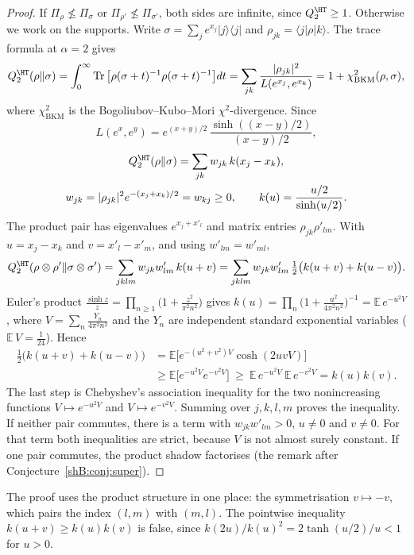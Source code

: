 \begin{proof}
If $\Pi_\rho\not\le\Pi_\sigma$ or $\Pi_{\rho'}\not\le\Pi_{\sigma'}$, both sides are infinite, since $Q^\HT_2\ge1$. Otherwise we work on the supports. Write $\sigma=\sum_je^{x_j}|j\rangle\langle j|$ and $\rho_{jk}=\langle j|\rho|k\rangle$. The trace formula at $\alpha=2$ \cite[(2.11)]{BeigiHircheTomamichel2025} gives
\[
Q^\HT_2(\rho\|\sigma)=\int_0^\infty\Tr\big[\rho(\sigma+t)^{-1}\rho(\sigma+t)^{-1}\big]dt=\sum_{jk}\frac{|\rho_{jk}|^2}{L(e^{x_j},e^{x_k})}=1+\chi^2_{\mathrm{BKM}}(\rho,\sigma),
\]
where $\chi^2_{\mathrm{BKM}}$ is the Bogoliubov--Kubo--Mori $\chi^2$-divergence. Since
\[
L(e^x,e^y)=e^{(x+y)/2}\,\frac{\sinh((x-y)/2)}{(x-y)/2},
\]
\begin{gather*}
Q^\HT_2(\rho\|\sigma)=\sum_{jk}w_{jk}\,k(x_j-x_k),\\
w_{jk}=|\rho_{jk}|^2e^{-(x_j+x_k)/2}=w_{kj}\ge0,\qquad k(u)=\frac{u/2}{\sinh(u/2)} .
\end{gather*}
The product pair has eigenvalues $e^{x_j+x'_l}$ and matrix entries $\rho_{jk}\rho'_{lm}$. With $u=x_j-x_k$ and $v=x'_l-x'_m$, and using $w'_{lm}=w'_{ml}$,
\[
Q^\HT_2(\rho\otimes\rho'\|\sigma\otimes\sigma')=\sum_{jklm}w_{jk}w'_{lm}\,k(u+v)=\sum_{jklm}w_{jk}w'_{lm}\,\tfrac12\big(k(u+v)+k(u-v)\big).
\]
Euler's product $\frac{\sinh z}{z}=\prod_{n\ge1}\big(1+\frac{z^2}{\pi^2n^2}\big)$ gives $k(u)=\prod_n\big(1+\frac{u^2}{4\pi^2n^2}\big)^{-1}=\mathbb E\,e^{-u^2V}$, where $V=\sum_n\frac{Y_n}{4\pi^2n^2}$ and the $Y_n$ are independent standard exponential variables ($\mathbb E\,V=\frac1{24}$). Hence
\[
\begin{aligned}
\tfrac12\big(k(u+v)+k(u-v)\big)&=\mathbb E\big[e^{-(u^2+v^2)V}\cosh(2uvV)\big]\\
&\ge\mathbb E\big[e^{-u^2V}e^{-v^2V}\big]\ \ge\ \mathbb E\,e^{-u^2V}\ \mathbb E\,e^{-v^2V}=k(u)k(v).
\end{aligned}
\]
The last step is Chebyshev's association inequality for the two nonincreasing functions $V\mapsto e^{-u^2V}$ and $V\mapsto e^{-v^2V}$. Summing over $j,k,l,m$ proves the inequality. If neither pair commutes, there is a term with $w_{jk}w'_{lm}>0$, $u\ne0$ and $v\ne0$. For that term both inequalities are strict, because $V$ is not almost surely constant. If one pair commutes, the product shadow factorises (the remark after Conjecture~\ref{shB:conj:super}).
\end{proof}

The proof uses the product structure in one place: the symmetrisation $v\mapsto-v$, which pairs the index $(l,m)$ with $(m,l)$. The pointwise inequality $k(u+v)\ge k(u)k(v)$ is false, since $k(2u)/k(u)^2=2\tanh(u/2)/u<1$ for $u>0$.

